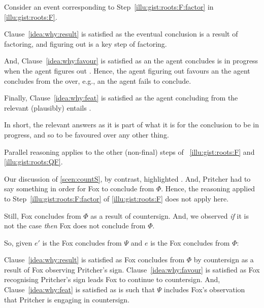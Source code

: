 \begin{note}
  Consider an event corresponding to Step~\ref{illu:gist:roots:F:factor} in \autoref{illu:gist:roots:F}.

  Clause~\ref{idea:why:result} is satisfied as the eventual conclusion is a result of factoring, and figuring out  is a key step of factoring.

  And, Clause~\ref{idea:why:favour} is satisfied as an  the agent concludes  is in progress when the agent figures out .
  Hence, the agent figuring out  favours an  the agent concludes  from the \pool{} over, e.g., an  the agent fails to conclude.

  Finally, Clause~\ref{idea:why:feat} is satisfied as the agent concluding  from the relevant \pool{} (plausibly) entails .
\end{note}


\begin{note}
  In short, the relevant  answers \qWhy{} as it is part of what it is for the conclusion to be in progress, and so to be favoured over any other thing.

  Parallel reasoning applies to the other (non-final) steps of ~\ref{illu:gist:roots:F} and \ref{illu:gist:roots:QF}.
\end{note}


\begin{note}
  Our discussion of \autoref{scen:countS}, by contrast, highlighted .
  And, Pritcher had to say something in order for Fox to conclude  from \(\Phi\).
  Hence, the reasoning applied to Step~\ref{illu:gist:roots:F:factor} of \autoref{illu:gist:roots:F} does not apply here.

  Still, Fox concludes  from \(\Phi\) as a result of countersign.
  And, we observed \emph{if} it is not the case  \emph{then} Fox does not conclude  from \(\Phi\).

  So, given \(e'\) is the  Fox concludes  from \(\Psi\) and \(e\) is the  Fox concludes  from \(\Phi\):

  Clause~\ref{idea:why:result} is satisfied as Fox concludes  from \(\Phi\) by countersign as a result of Fox observing Pritcher's sign.
  Clause~\ref{idea:why:favour} is satisfied as Fox recognising Pritcher's sign leads Fox to continue to countersign.
  And, Clause~\ref{idea:why:feat} is satisfied as  is such that \(\Psi\) includes Fox's observation that Pritcher is engaging in countersign.
\end{note}


